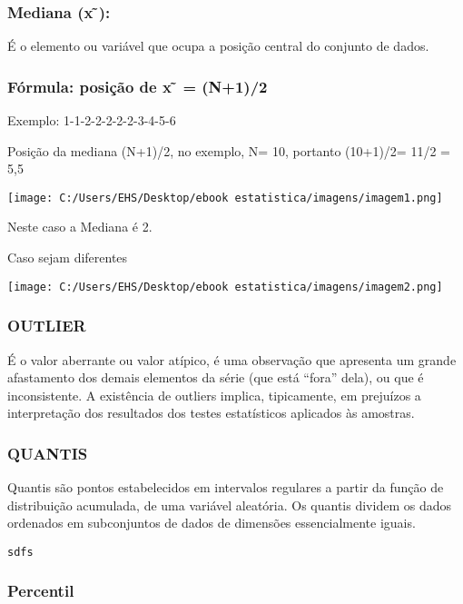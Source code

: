 \documentclass[]{book}
\begin{document}
\hypertarget{mediana-x}{%
\subsubsection{Mediana (x ̃):}\label{mediana-x}}

É o elemento ou variável que ocupa a posição central do conjunto de dados.

\hypertarget{formula-posicao-de-x-n12}{%
\subsubsection{Fórmula: posição de x ̃ = (N+1)/2}\label{formula-posicao-de-x-n12}}

Exemplo: 1-1-2-2-2-2-2-3-4-5-6

Posição da mediana (N+1)/2, no exemplo, N= 10, portanto (10+1)/2= 11/2 = 5,5

\texttt{[image: C:/Users/EHS/Desktop/ebook estatistica/imagens/imagem1.png]}

Neste caso a Mediana é 2.

Caso sejam diferentes

\texttt{[image: C:/Users/EHS/Desktop/ebook estatistica/imagens/imagem2.png]}

\hypertarget{outlier}{%
\subsubsection{OUTLIER}\label{outlier}}

É o valor aberrante ou valor atípico, é uma observação que apresenta um grande afastamento dos demais elementos da série (que está ``fora'' dela), ou que é inconsistente. A existência de outliers implica, tipicamente, em prejuízos a interpretação dos resultados dos testes estatísticos aplicados às amostras.

\hypertarget{quantis}{%
\subsubsection{QUANTIS}\label{quantis}}

Quantis são pontos estabelecidos em intervalos regulares a partir da função de distribuição acumulada, de uma variável aleatória. Os quantis dividem os dados ordenados em subconjuntos de dados de dimensões essencialmente iguais.

\texttt{sdfs}

\hypertarget{percentil}{%
\subsubsection{Percentil}\label{percentil}}
\end{document}
